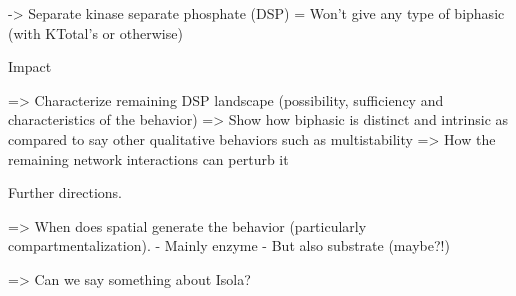 \documentclass{article}
\begin{document}
-> Separate kinase separate phosphate (DSP)
        = Won't give any type of biphasic (with KTotal's or otherwise)
        
        
Impact 

=> Characterize remaining DSP landscape (possibility, sufficiency and characteristics of the behavior)
=> Show how biphasic is distinct and intrinsic as compared to say other qualitative behaviors such as multistability
=> How the remaining network interactions can perturb it




Further directions. 

=> When does spatial generate the behavior (particularly compartmentalization).
        - Mainly enzyme
        - But also substrate (maybe?!)
        
=> Can we say something about Isola? 
        
\end{document}
